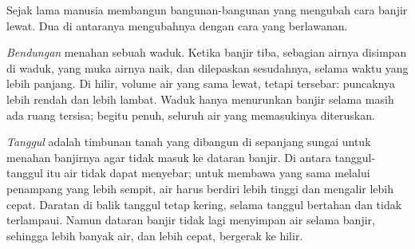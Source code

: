 Sejak lama manusia membangun bangunan-bangunan yang mengubah cara banjir
lewat. Dua di antaranya mengubahnya dengan cara yang berlawanan.

\emph{Bendungan} menahan sebuah waduk. Ketika banjir tiba, sebagian airnya
disimpan di waduk, yang muka airnya naik, dan dilepaskan sesudahnya, selama
waktu yang lebih panjang. Di hilir, volume air yang sama lewat, tetapi
tersebar: puncaknya lebih rendah dan lebih lambat. Waduk hanya menurunkan
banjir selama masih ada ruang tersisa; begitu penuh, seluruh air yang
memasukinya diteruskan.

\emph{Tanggul} adalah timbunan tanah yang dibangun di sepanjang sungai untuk
menahan banjirnya agar tidak masuk ke dataran banjir. Di antara tanggul-tanggul
itu air tidak dapat menyebar; untuk membawa  yang sama melalui penampang
yang lebih sempit, air harus berdiri lebih tinggi dan mengalir lebih cepat.
Daratan di balik tanggul tetap kering, selama tanggul bertahan dan tidak
terlampaui. Namun dataran banjir tidak lagi menyimpan air selama banjir,
sehingga lebih banyak air, dan lebih cepat, bergerak ke hilir.

